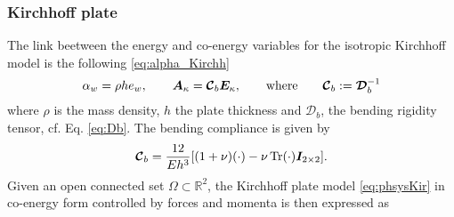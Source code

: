 \subsubsection{Kirchhoff plate}\label{sec:discr_Kir}
The link beetween the energy and co-energy variables for the isotropic Kirchhoff model is the following \eqref{eq:alpha_Kirchh}
\begin{equation}
\alpha_w ={\rho h}e_w , \qquad \bm{A}_{\kappa} = \bm{\mathcal{C}}_b\bm{E}_{\kappa}, \qquad \text{where} \qquad \bm{\mathcal{C}}_b :=  \bm{\mathcal{D}}_b^{-1}
\end{equation}
where $\rho$ is the mass density, $h$ the plate thickness and $\bm{\mathcal{D}}_b$, the bending rigidity tensor, cf. Eq. \eqref{eq:Db}. The bending compliance is given by 
\begin{equation}\label{eq:bend_compliace}
\bm{\mathcal{C}}_b = \frac{12}{E h^3}[(1 + \nu)(\cdot) - \nu \operatorname{Tr}(\cdot)\bm{I}_{2\times 2}].
\end{equation}
Given an open connected set $\Omega\subset \mathbb{R}^2$, the Kirchhoff plate model \eqref{eq:phsysKir} in co-energy form controlled by forces and momenta is then expressed as 
